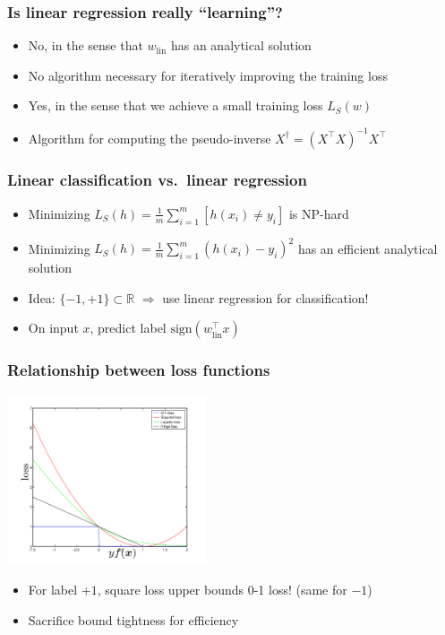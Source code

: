 \documentclass[10pt]{beamer}
\begin{document}
\begin{frame}
  \frametitle{Is linear regression really ``learning''?}
  \begin{itemize}
	\item {\color{red} No}, in the sense that $w_{\mathrm{lin}}$ has an {\color{red} analytical solution}
	\item No algorithm necessary for iteratively improving the training loss
	\item {\color{green} Yes}, in the sense that we achieve a small training loss $L_S(w)$
	\item Algorithm for computing the pseudo-inverse $X^\dagger = (X^\top X)^{-1}X^\top$
  \end{itemize}
\end{frame}

\begin{frame}
  \frametitle{Linear classification vs.~linear regression}
  \begin{itemize}
	\item Minimizing $L_S(h) = \frac 1 m \sum_{i=1}^m [h(x_i) \neq y_i]$ is {\color{red} NP-hard}
	\item Minimizing $L_S(h) = \frac 1 m \sum_{i=1}^m (h(x_i) - y_i)^2$ has an {\color{green} efficient analytical solution}
	\item {\color{blue} Idea}: $\{-1,+1\} \subset \mathbb{R}$ $\Rightarrow$ use linear regression for classification!
	\item On input $x$, predict label $\mathrm{sign}(w_{\mathrm{lin}}^\top x)$
  \end{itemize}
\end{frame}

\begin{frame}
  \frametitle{Relationship between loss functions}
  \begin{center}
  \includegraphics[height=5cm]{images/losses.png}
  \end{center}
  \begin{itemize}
	\item For label $+1$, square loss upper bounds 0-1 loss! (same for $-1$)
	\item Sacrifice {\color{red} bound tightness} for {\color{green} efficiency}
  \end{itemize}
\end{frame}
\end{document}

